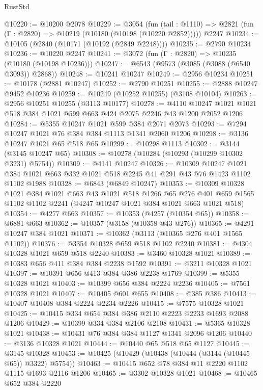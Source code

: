 \begin{lexlean}{RustStd}
\begin{coremodule}
{\begin{coremodule}
{{{{{{{{{{{{{{{{{{{{{{{{{{@10220 := @10200 @2078
@10229 := @3054
    (fun (tail : @1110) => @2821 (fun (Γ : @2820) => @10219 (@10180 (@10198 (@10220 @2852)))))
    @2247
@10234 := @10105 (@2840 (@10171 (@10192 (@2849 @2248))))
@10235 := @2790 @10234
@10236 := @10220 @2247
@10241 := @3072 (fun (Γ : @2820) => @10235 (@10180 (@10198 @10236)))
@10247 := @6543 (@9573 (@3085 (@3088 (@6540 @3093)) @2868))
@10248 := @10241 @10247
@10249 := @2956 @10234
@10251 := @10178 (@2881 @10247)
@10252 := @2790 @10251
@10255 := @2888 @10247 @9452 @10236
@10259 := @10249 (@10252 @10255) (@3108 @10104)
@10263 := @2956 @10251 @10255 (@3113 @10177)
@10278 := @4110 @10247 @1021 @1021 @518 @384 @1021 @599 @663 @424 @2075 @2246 @43 @1200 @2052 @1206
@10284 := @5355 @10247 @1021 @599 @384 @2071 @2073
@10293 := @7294 @10247 @1021 @76 @384 @384 @1113 @1341 @2060 @1206
@10298 := @3136 @10247 @1021 @65 @518 @65
@10299 := @10298 @1113
@10302 := @3144 (@3145 @10247 @65)
@10308 := @10278 (@10284 (@10293 (@10299 @10302 @3231) @5754))
@10309 := @4141 @10247
@10326 := @10309
    @10247
    @1021
    @384
    @1021
    @663
    @332
    @1021
    @518
    @2245
    @41
    @291
    @43
    @76
    @1423
    @1102
    @1102
    @1988
@10328 := @6843 (@6849 @10247)
@10353 := @10309
    @10328
    @1021
    @384
    @1021
    @663
    @43
    @1021
    @518
    @1266
    @65
    @276
    @401
    @659
    @1565
    @1102
    @1102
    @2241
    (@4247 @10247 @1021 @384 @1021 @663 @1021 @518)
@10354 := @4277 @663
@10357 := @10353 (@4257 (@10354 @65))
@10358 := @6881 @663
@10362 := @10357 (@3158 (@10358 @43 @276))
@10365 := @4291 @10247 @384 @1021
@10371 := @10362 (@3113 (@10365 @276 @401 @1565 @1102))
@10376 := @3354 @10328 @659 @518 @1102 @2240
@10381 := @4304 @10328 @1021 @659 @518 @2240
@10383 := @3460 @10328 @1021
@10389 := @10383 @656 @411 @384 @384 @2238 @1592
@10391 := @3211 @10328 @1021
@10397 := @10391 @656 @413 @384 @386 @2238 @1769
@10399 := @5355 @10328 @1021
@10403 := @10399 @656 @384 @2224 @2236
@10405 := @7561 @10328 @1021
@10407 := @10405 @601 @655
@10408 := @385 @386
@10413 := @10407 @10408 @384 @2224 @2234 @2226
@10415 := @7575 @10328 @1021
@10425 := @10415 @334 @654 @384 @386 @2110 @2223 @2233 @1693 @2088 @1206
@10429 := @10399 @334 @384 @2106 @2108
@10431 := @5365 @10328 @1021
@10438 := @10431 @76 @384 @384 @1127 @1341 @2096 @1206
@10440 := @3136 @10328 @1021
@10444 := @10440 @65 @518 @65 @1127
@10445 := @3145 @10328
@10453 := @10425 (@10429 (@10438 (@10444 (@3144 (@10445 @65)) @3322) @5754))
@10463 := @10415 @652 @78 @384 @11 @2220 @1102 @1115 @1693 @2116 @1206
@10465 := @3302 @10328 @1021
@10468 := @10465 @652 @384 @2220
}}}}}}}}}}}}}}}}}}}}}}}}}}
\end{coremodule}}
\end{coremodule}
\end{lexlean}
